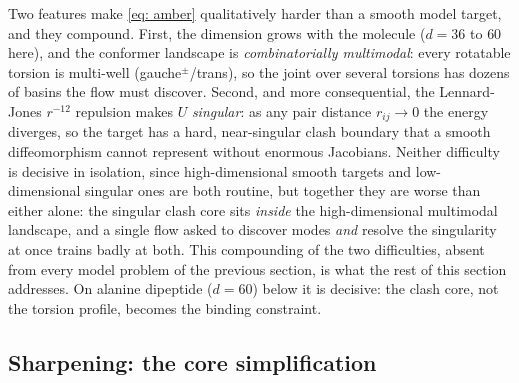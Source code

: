 \documentclass{article}
\begin{document}
Two features make \eqref{eq: amber} qualitatively harder than a smooth model target, and they compound. First,
the dimension grows with the molecule ($d = 36$ to $60$ here), and the conformer landscape is
\emph{combinatorially multimodal}: every rotatable torsion is multi-well (gauche$^{\pm}$/trans), so the joint
over several torsions has dozens of basins the flow must discover. Second, and more consequential, the
Lennard-Jones $r^{-12}$ repulsion makes $U$ \emph{singular}: as any pair distance $r_{ij} \to 0$ the energy
diverges, so the target has a hard, near-singular clash boundary that a smooth diffeomorphism cannot represent
without enormous Jacobians. Neither difficulty is decisive in isolation, since high-dimensional smooth targets
and low-dimensional singular ones are both routine, but together they are worse than either alone: the
singular clash core sits \emph{inside} the high-dimensional multimodal landscape, and a single flow asked to
discover modes \emph{and} resolve the singularity at once trains badly at both. This compounding of the two
difficulties, absent from every model problem of the previous section, is what the rest of this section
addresses. On alanine dipeptide ($d = 60$) below it is decisive: the clash core, not the torsion profile,
becomes the binding constraint.

\subsection{Sharpening: the core simplification}
\label{sec: mol-sharpening}
\end{document}
